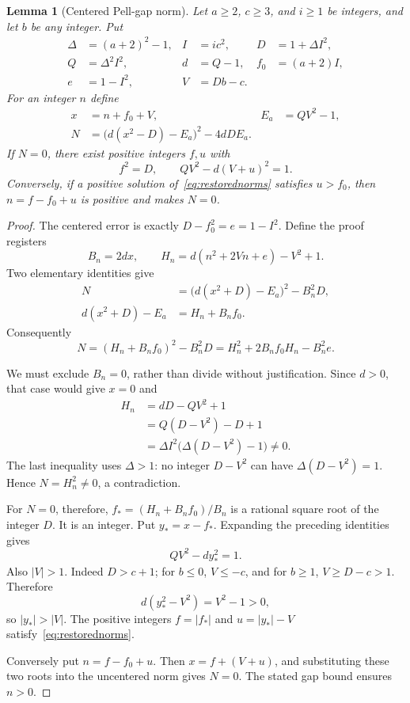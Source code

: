 \documentclass[11pt]{article}
\newtheorem{lemma}[theorem]{Lemma}
\theoremstyle{remark}
\begin{document}
\begin{lemma}[Centered Pell-gap norm]
Let $a\ge2$, $c\ge3$, and $i\ge1$ be integers, and let $b$ be any integer.
Put
\begin{align}
 \Delta&=(a+2)^2-1,& I&=ic^2,&D&=1+\Delta I^2,\\
 Q&=\Delta^2I^2,&d&=Q-1,&f_0&=(a+2)I,\\
 e&=1-I^2,&V&=Db-c.
\end{align}
For an integer $n$ define
\begin{align}
 x&=n+f_0+V,& E_a&=QV^2-1,\\
 N&=\bigl(d(x^2-D)-E_a\bigr)^2-4dDE_a.
 \label{eq:Nliteral}
\end{align}
If $N=0$, there exist positive integers $f,u$ with
\begin{equation}
 f^2=D,\qquad QV^2-d(V+u)^2=1.
 \label{eq:restorednorms}
\end{equation}
Conversely, if a positive solution of~\eqref{eq:restorednorms} satisfies
$u>f_0$, then $n=f-f_0+u$ is positive and makes $N=0$.
\end{lemma}

\begin{proof}
The centered error is exactly $D-f_0^2=e=1-I^2$. Define the proof registers
\[
 B_n=2dx,\qquad H_n=d(n^2+2Vn+e)-V^2+1.
\]
Two elementary identities give
\begin{align}
 N&=\bigl(d(x^2+D)-E_a\bigr)^2-B_n^2D,\\
 d(x^2+D)-E_a&=H_n+B_nf_0.
\end{align}
Consequently
\begin{equation}
 N=(H_n+B_nf_0)^2-B_n^2D
   =H_n^2+2B_nf_0H_n-B_n^2e.
 \label{eq:Ncentered}
\end{equation}

We must exclude $B_n=0$, rather than divide without justification.
Since $d>0$, that case would give $x=0$ and
\begin{align*}
 H_n&=dD-QV^2+1\\
    &=Q(D-V^2)-D+1\\
    &=\Delta I^2\bigl(\Delta(D-V^2)-1\bigr)\ne0.
\end{align*}
The last inequality uses $\Delta>1$: no integer $D-V^2$ can have
$\Delta(D-V^2)=1$. Hence $N=H_n^2\ne0$, a contradiction.

For $N=0$, therefore,
$f_*=(H_n+B_nf_0)/B_n$ is a rational square root of the integer $D$.
It is an integer. Put $y_*=x-f_*$. Expanding the preceding identities gives
\[
 QV^2-dy_*^2=1.
\]
Also $|V|>1$. Indeed $D>c+1$; for $b\le0$, $V\le-c$, and for
$b\ge1$, $V\ge D-c>1$. Therefore
\[
 d(y_*^2-V^2)=V^2-1>0,
\]
so $|y_*|>|V|$. The positive integers
$f=|f_*|$ and $u=|y_*|-V$ satisfy~\eqref{eq:restorednorms}.

Conversely put $n=f-f_0+u$. Then $x=f+(V+u)$, and substituting these
two roots into the uncentered norm gives $N=0$. The stated gap bound
ensures $n>0$.
\end{proof}
\end{document}
